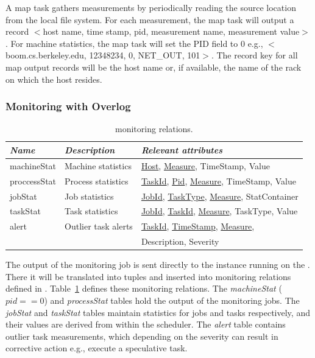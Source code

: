 A map task gathers measurements by periodically reading the source location from the local file system. 
For each measurement, the map task will output a record $<$host name, time stamp, pid, measurement name, measurement value$>$.
For machine statistics, the map task will set the PID field to $0$ e.g., $<$boom.cs.berkeley.edu, 12348234, 0, NET\_OUT, 101$>$.
The record key for all map output records will be the host name or, if available, the name of the rack on which the 
host resides.

\subsubsection{Monitoring with Overlog}

\begin{table}
\ssp
\centering
\begin{tabular}{|l|l|l|} \hline
\textit{Name}    & \textit{Description} & \textit{Relevant attributes} \\ \hline\hline
machineStat    & Machine statistics   & \underline{Host}, \underline{Measure}, TimeStamp, Value \\ \hline
proccessStat   & Process statistics    & \underline{TaskId}, \underline{Pid}, \underline{Measure}, TimeStamp, Value \\ \hline
jobStat              & Job statistics            & \underline{JobId}, \underline{TaskType}, \underline{Measure}, StatContainer \\ \hline
taskStat            & Task statistics          & \underline{JobId}, \underline{TaskId}, \underline{Measure}, TaskType, Value \\ \hline
alert                   & Outlier task alerts   & \underline{TaskId}, \underline{TimeStamp}, \underline{Measure}, \\
                           &                                   & Description, Severity \\ \hline
\end{tabular}
\caption{\JOL monitoring relations.}
\label{ch:hop:tbl:monitorCatalog}
\end{table}

The output of the monitoring job is sent directly to the \JOL instance running on the \JT. There it will be translated into \JOL
tuples and inserted into monitoring relations defined in \JOL. Table~\ref{ch:hop:tbl:monitorCatalog} defines these monitoring 
relations. The {\em machineStat} ($pid == 0$) and {\em processStat} tables hold the output of the monitoring jobs. The {\em jobStat} 
and {\em taskStat} tables maintain statistics for jobs and tasks respectively, and their values are derived from within the scheduler.  
The {\em alert} table contains outlier task measurements, which depending on the severity can result in corrective action e.g., execute
a speculative task. 


